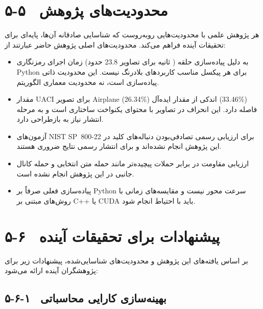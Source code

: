 \section{۵-۵  محدودیت‌های پژوهش}

هر پژوهش علمی با محدودیت‌هایی روبه‌روست که شناسایی صادقانه آن‌ها، پایه‌ای برای تحقیقات آینده فراهم می‌کند. محدودیت‌های اصلی پژوهش حاضر عبارتند از:

\begin{itemize}
    \item زمان اجرای رمزنگاری (حدود ‎23.8‎ ثانیه برای تصاویر ) به دلیل پیاده‌سازی حلقه ‎Python‎ برای هر پیکسل مناسب کاربردهای بلادرنگ نیست. این محدودیت ذاتی پیاده‌سازی است، نه محدودیت معماری الگوریتم.
\end{itemize}

\begin{itemize}
    \item مقدار ‎UACI‎ برای تصویر ‎Airplane‎ (‎‎26.34\%‎‎) اندکی از مقدار ایده‌آل (‎‎33.46\%‎‎) فاصله دارد. این انحراف در تصاویر با محتوای یکنواخت ساختاری است و به مرحله انتشار نیاز به بازطراحی دارد.
\end{itemize}

\begin{itemize}
    \item آزمون‌های ‎NIST‎ ‎SP~800-22‎ برای ارزیابی رسمی تصادفی‌بودن دنباله‌های کلید در این پژوهش انجام نشده‌اند و برای انتشار رسمی نتایج ضروری هستند.
\end{itemize}

\begin{itemize}
    \item ارزیابی مقاومت در برابر حملات پیچیده‌تر مانند حمله متن انتخابی و حمله کانال جانبی در این پژوهش انجام نشده است.
\end{itemize}

\begin{itemize}
    \item پیاده‌سازی فعلی صرفاً بر ‎Python‎ سرعت محور نیست و مقایسه‌های زمانی با روش‌های مبتنی بر ‎C++‎ یا ‎CUDA‎ باید با احتیاط انجام شود.
\end{itemize}

\section{۵-۶  پیشنهادات برای تحقیقات آینده}

بر اساس یافته‌های این پژوهش و محدودیت‌های شناسایی‌شده، پیشنهادات زیر برای پژوهشگران آینده ارائه می‌شود:

\subsection{۵-۶-۱  بهینه‌سازی کارایی محاسباتی}

